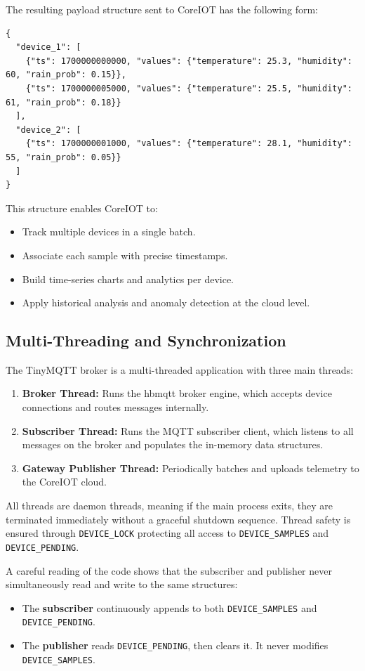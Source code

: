 The resulting payload structure sent to CoreIOT has the following form:
\begin{verbatim}
{
  "device_1": [
    {"ts": 1700000000000, "values": {"temperature": 25.3, "humidity": 60, "rain_prob": 0.15}},
    {"ts": 1700000005000, "values": {"temperature": 25.5, "humidity": 61, "rain_prob": 0.18}}
  ],
  "device_2": [
    {"ts": 1700000001000, "values": {"temperature": 28.1, "humidity": 55, "rain_prob": 0.05}}
  ]
}
\end{verbatim}

This structure enables CoreIOT to:
\begin{itemize}
  \item Track multiple devices in a single batch.
  \item Associate each sample with precise timestamps.
  \item Build time-series charts and analytics per device.
  \item Apply historical analysis and anomaly detection at the cloud level.
\end{itemize}

\subsection*{Multi-Threading and Synchronization}

The TinyMQTT broker is a multi-threaded application with three main threads:
\begin{enumerate}
  \item \textbf{Broker Thread:} Runs the hbmqtt broker engine, which accepts device connections and routes messages internally.
  \item \textbf{Subscriber Thread:} Runs the MQTT subscriber client, which listens to all messages on the broker and populates the in-memory data structures.
  \item \textbf{Gateway Publisher Thread:} Periodically batches and uploads telemetry to the CoreIOT cloud.
\end{enumerate}

All threads are daemon threads, meaning if the main process exits, they are terminated immediately without a graceful shutdown sequence. Thread safety is ensured through \texttt{DEVICE\_LOCK} protecting all access to \texttt{DEVICE\_SAMPLES} and \texttt{DEVICE\_PENDING}.

A careful reading of the code shows that the subscriber and publisher never simultaneously read and write to the same structures:
\begin{itemize}
  \item The \textbf{subscriber} continuously appends to both \texttt{DEVICE\_SAMPLES} and \texttt{DEVICE\_PENDING}.
  \item The \textbf{publisher} reads \texttt{DEVICE\_PENDING}, then clears it. It never modifies \texttt{DEVICE\_SAMPLES}.
\end{itemize}

